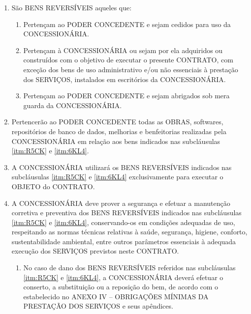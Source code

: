 \documentclass[a4paper,11pt]{report} %
\begin{document}
\begin{enumerate}
\item \label{itm:P87Z} São BENS REVERSÍVEIS aqueles que:

\begin{enumerate}[label*=\arabic*.]
\item \label{itm:R5CK}	Pertençam ao PODER CONCEDENTE e sejam cedidos para uso da CONCESSIONÁRIA.

\item \label{itm:6KL4} Pertençam à CONCESSIONÁRIA ou sejam por ela adquiridos ou construídos com o objetivo de executar o presente CONTRATO, com exceção dos bens de uso administrativo e/ou não essenciais à prestação dos SERVIÇOS, instalados em escritórios da CONCESSIONÁRIA.

\item \label{itm:SKHH} Pertençam ao PODER CONCEDENTE e sejam abrigados sob mera guarda da CONCESSIONÁRIA.
\end{enumerate}

\item \label{itm:5BHL} Pertencerão ao PODER CONCEDENTE todas as OBRAS, softwares, repositórios de banco de dados, melhorias e benfeitorias realizadas pela CONCESSIONÁRIA em relação aos bens indicados nas subcláusulas \ref{itm:R5CK} e \ref{itm:6KL4}.

\item \label{itm:723E} A CONCESSIONÁRIA utilizará os BENS REVERSÍVEIS indicados nas subcláusulas \ref{itm:R5CK} e \ref{itm:6KL4} exclusivamente para executar o OBJETO do CONTRATO.

\item \label{itm:7BBJ} A CONCESSIONÁRIA deve prover a segurança e efetuar a manutenção corretiva e preventiva dos BENS REVERSÍVEIS indicados nas subcláusulas \ref{itm:R5CK} e \ref{itm:6KL4}, conservando-os em condições adequadas de uso, respeitando as normas técnicas relativas à saúde, segurança, higiene, conforto, sustentabilidade ambiental, entre outros parâmetros essenciais à adequada execução dos SERVIÇOS previstos neste CONTRATO.

\begin{enumerate}[label*=\arabic*.]
\item \label{itm:628D} No caso de dano dos BENS REVERSÍVEIS referidos nas subcláusulas \ref{itm:R5CK} e \ref{itm:6KL4}, a CONCESSIONÁRIA deverá efetuar o conserto, a substituição ou a reposição do bem, de acordo com o estabelecido no ANEXO IV – OBRIGAÇÕES MÍNIMAS DA PRESTAÇÃO DOS SERVIÇOS e seus apêndices.
\end{enumerate}


\end{enumerate}
\end{document}
